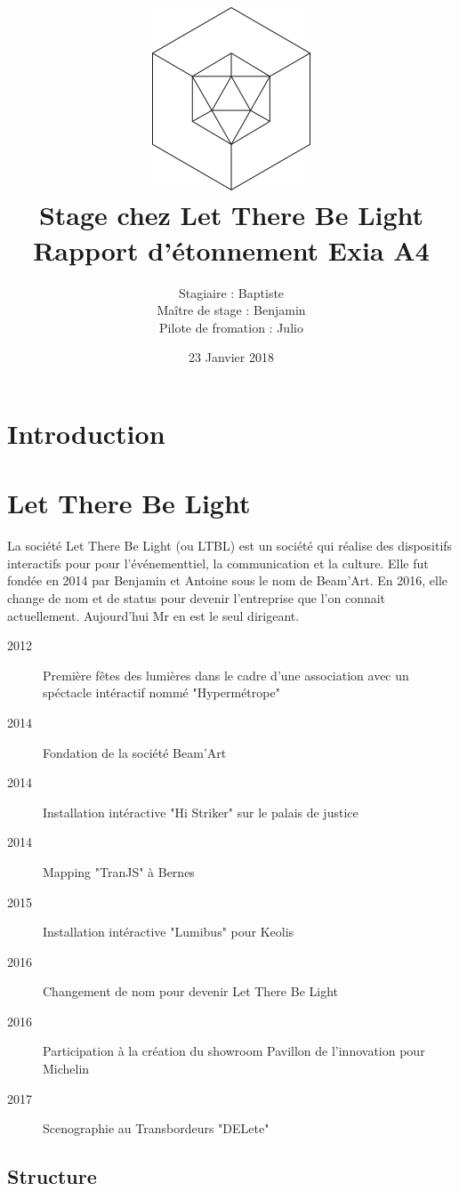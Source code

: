 \documentclass{article}
\title{\includegraphics{logo.png}\vspace{2cm}\\Stage chez Let There Be Light \\ \large Rapport d'étonnement Exia A4}
\date{23 Janvier 2018}
\author{Stagiaire : Baptiste \bsc{Saclier} \\ Maître de stage : Benjamin \basc{Petit}\\Pilote de fromation : Julio \basc{Santilario}}
\begin{document}
\maketitle

\clearpage

\tableofcontents

\section{Introduction}


\clearpage

\section{Let There Be Light}

La société Let There Be Light (ou LTBL) est un société qui réalise des dispositifs interactifs pour pour l'événementtiel, la communication et la culture.
Elle fut fondée en 2014 par Benjamin  et Antoine  sous le nom de Beam'Art.
En 2016, elle change de nom et de status pour devenir l'entreprise que l'on connait actuellement.
Aujourd'hui Mr  en est le seul dirigeant.

\begin{description}
    \item[2012] Première fêtes des lumières dans le cadre d'une association avec un spéctacle intéractif nommé "Hypermétrope"
    \item[2014] Fondation de la société Beam'Art
    \item[2014] Installation intéractive "Hi Striker" sur le palais de justice
    \item[2014] Mapping "TranJS" à Bernes
    \item[2015] Installation intéractive "Lumibus" pour Keolis
    \item[2016] Changement de nom pour devenir Let There Be Light
    \item[2016] Participation à la création du showroom Pavillon de l'innovation pour Michelin
    \item[2017] Scenographie au Transbordeurs "DELete"
\end{description}

\subsection{Structure}
\end{document}
